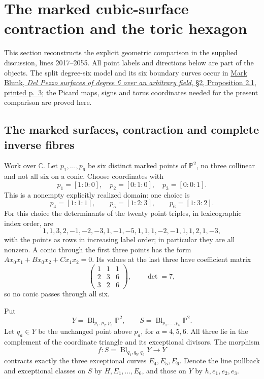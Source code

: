 \section{The marked cubic-surface contraction and the toric hexagon}
\label{sec:picard-hexagon}
This section reconstructs the explicit geometric comparison in the supplied
discussion, lines 2017--2055. All point labels and directions below are part
of the objects. The split degree-six model and its six boundary curves occur
in \href{https://www.math.uni-bielefeld.de/lag/man/290.pdf}{Mark Blunk,
\emph{Del Pezzo surfaces of degree 6 over an arbitrary field}, \S2,
Proposition 2.1, printed p.~3}; the Picard maps, signs and torus coordinates
needed for the present comparison are proved here.

\subsection{The marked surfaces, contraction and complete inverse fibres}
Work over $\mathbb C$. Let $p_1,\ldots,p_6$ be six distinct marked points
of $\mathbb P^2$, no three collinear and not all six on a conic. Choose
coordinates with
\[
 p_1=[1:0:0],\quad p_2=[0:1:0],\quad p_3=[0:0:1].
\]
This is a nonempty explicitly realized domain: one choice is
\[
 p_4=[1:1:1],\qquad p_5=[1:2:3],\qquad p_6=[1:3:2].             \tag{PH1}
\]
For this choice the determinants of the twenty point triples, in
lexicographic index order, are
\[
1,1,3,2,-1,-2,-3,1,-1,-5,1,1,1,-2,-1,1,1,2,1,-3,
\]
with the points as rows in increasing label order; in particular they are all
nonzero. A conic through the first three points has the form
$A x_0x_1+B x_0x_2+C x_1x_2=0$. Its values at the last three have coefficient
matrix
\[
\begin{pmatrix}1&1&1\\2&3&6\\3&2&6\end{pmatrix},\qquad\det=7,
\]
so no conic passes through all six.

Put
\[
Y=\operatorname{Bl}_{p_1,p_2,p_3}\mathbb P^2,
\qquad S=\operatorname{Bl}_{p_1,\ldots,p_6}\mathbb P^2.
\]
Let $q_a\in Y$ be the unchanged point above $p_a$, for $a=4,5,6$.
All three lie in the complement of the coordinate triangle and its
exceptional divisors. The morphism
\[
 f:S=\operatorname{Bl}_{q_4,q_5,q_6}Y\longrightarrow Y             \tag{PH2}
\]
contracts exactly the three exceptional curves $E_4,E_5,E_6$.
Denote the line pullback and exceptional classes on $S$ by $H,E_1,\ldots,E_6$,
and those on $Y$ by $h,e_1,e_2,e_3$.

